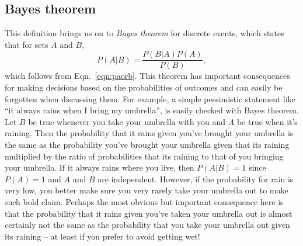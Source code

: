 \subsection{Bayes theorem}
This definition brings us on to \emph{Bayes theorem} for discrete events, which states that for sets $A$ and $B$, 
\begin{equation}\label{eqn:bayesdiscrete}
     P(A|B) = \frac{P(B|A)P(A)}{P(B)},
\end{equation}
which follows from Eqn.~\ref{eqn:paorb}.
This theorem has important consequences for making decisions based on the probabilities of outcomes and can easily be forgotten when discussing them. For example, a simple pessimistic statement like ``it always rains when I bring my umbrella'', is easily checked with Bayes theorem. Let $B$ be true whenever you take your umbrella with you and $A$ be true when it's raining. Then the probability that it rains given you've brought your umbrella is the same as the probability you've brought your umbrella given that its raining multiplied by the ratio of probabilities that its raining to that of you bringing your umbrella. If it always rains where you live, then $P(A|B)=1$ since $P(A)=1$ and $A$ and $B$ are independent. However, if the probability for rain is very low, you better make sure you very rarely take your umbrella out to make such bold claim. Perhaps the most obvious but important consequence here is that the probability that it rains given you've taken your umbrella out is almost certainly not the same as the probability that you take your umbrella out given its raining -- at least if you prefer to avoid getting wet!

